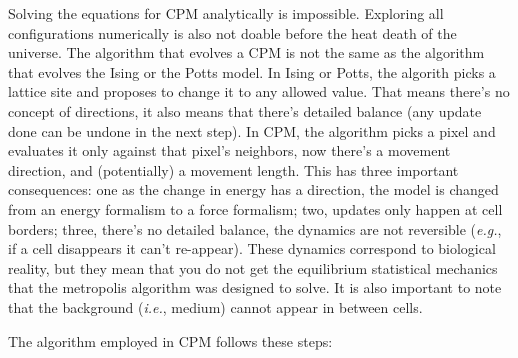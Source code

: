 Solving the equations for CPM analytically is impossible. Exploring all configurations numerically is also not doable before the heat death of the universe. The algorithm that evolves a CPM is not the same as the algorithm that evolves the Ising or the Potts model. In Ising or Potts, the algorith picks a lattice site and proposes to change it to any allowed value. That means there's no concept of directions, it also means that there's detailed balance (any update done can be undone in the next step). In CPM, the algorithm picks a pixel and evaluates it only against that pixel's neighbors, now there's a movement direction, and (potentially) a movement length. This has three important consequences: one as the change in energy has a direction, the model is changed from an energy formalism to a force formalism; two, updates only happen at cell borders; three, there's no detailed balance, the dynamics are not reversible (\textit{e.g.}, if a cell disappears it can't re-appear). These dynamics correspond to biological reality, but they mean that you do not get the equilibrium statistical mechanics that the metropolis algorithm was designed to solve. It is also important to note that the background (\textit{i.e.}, medium) cannot appear in between cells.

The algorithm employed in CPM follows these steps:




